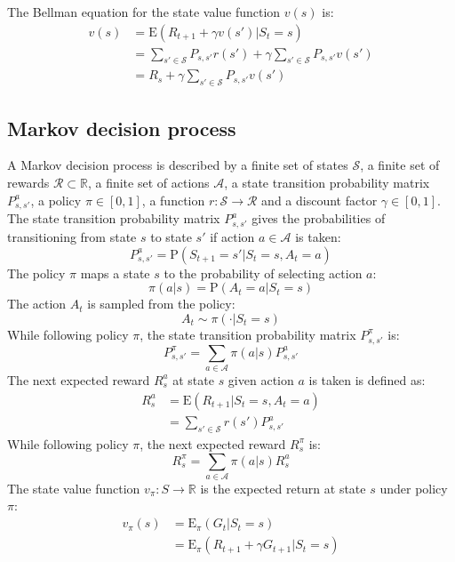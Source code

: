 \documentclass{article}
\begin{document}
The Bellman equation for the state value function $ v(s) $ is:
\begin{equation*}
\begin{split}
v(s) & = \text{E}(R_{t+1} + \gamma v(s') | S_t = s) \\
 & = \sum_{s' \in \mathcal{S}} P_{s,s'} r(s') + \gamma \sum_{s' \in \mathcal{S}} P_{s,s'} v(s') \\
 & = R_s + \gamma \sum_{s' \in \mathcal{S}} P_{s,s'} v(s')
\end{split}
\end{equation*}

\subsection{Markov decision process}
A Markov decision process is described by a finite set of states $ \mathcal{S} $, a finite set of rewards $ \mathcal{R} \subset \mathbb{R} $, a finite set of actions $ \mathcal{A} $, a state transition probability matrix $ P_{s,s'}^a $, a policy $ \pi \in [0,1] $, a function $r: \mathcal{S} \to \mathcal{R} $ and a discount factor $ \gamma \in [0, 1] $. The state transition probability matrix $ P_{s,s'}^a $ gives the probabilities of transitioning from state $ s $ to state $ s' $ if action $ a \in \mathcal{A} $ is taken:
\[ P_{s,s'}^a = \text{P}(S_{t+1} = s' | S_t = s, A_t = a) \]
The policy $ \pi $ maps a state $ s $ to the probability of selecting action $ a $:
\[ \pi(a | s) = \text{P}(A_t = a | S_t = s) \]
The action $ A_t $ is sampled from the policy:
\[ A_t \sim \pi( \cdot | S_t = s) \]
While following policy $ \pi $, the state transition probability matrix $ P_{s,s'}^{\pi} $ is:
\[ P_{s,s'}^{\pi} = \sum_{a \in \mathcal{A}} \pi(a | s) P_{s,s'}^a \]
The next expected reward $ R_s^a $ at state $ s $ given action $ a $ is taken is defined as:
\begin{equation*}
\begin{split}
R_s^a & = \text{E}(R_{t+1} | S_t = s, A_t = a) \\
 & = \sum_{s' \in \mathcal{S}} r(s') P_{s,s'}^a
\end{split}
\end{equation*}
While following policy $ \pi $, the next expected reward $ R_s^{\pi} $ is:
\[ R_s^{\pi} = \sum_{a \in \mathcal{A}} \pi(a | s) R_s^a \]
The state value function $ v_{\pi}: S \to \mathbb{R} $ is the expected return at state $ s $ under policy $ \pi $:
\begin{equation*}
\begin{split}
v_{\pi}(s) & = \text{E}_{\pi}(G_t | S_t = s) \\
 & = \text{E}_{\pi}(R_{t+1} + \gamma G_{t+1} | S_t = s)
\end{split}
\end{equation*}
\end{document}
